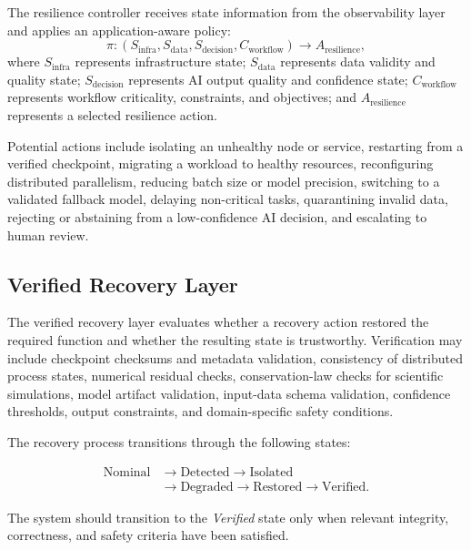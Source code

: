 \documentclass[conference]{IEEEtran}
\begin{document}
The resilience controller receives state information from the observability layer and applies an application-aware policy:
\begin{equation}
\pi : (S_{\mathrm{infra}}, S_{\mathrm{data}}, S_{\mathrm{decision}}, C_{\mathrm{workflow}}) \rightarrow A_{\mathrm{resilience}},
\end{equation}
where $S_{\mathrm{infra}}$ represents infrastructure state; $S_{\mathrm{data}}$ represents data validity and quality state; $S_{\mathrm{decision}}$ represents AI output quality and confidence state; $C_{\mathrm{workflow}}$ represents workflow criticality, constraints, and objectives; and $A_{\mathrm{resilience}}$ represents a selected resilience action.

Potential actions include isolating an unhealthy node or service, restarting from a verified checkpoint, migrating a workload to healthy resources, reconfiguring distributed parallelism, reducing batch size or model precision, switching to a validated fallback model, delaying non-critical tasks, quarantining invalid data, rejecting or abstaining from a low-confidence AI decision, and escalating to human review.

\subsection{Verified Recovery Layer}

The verified recovery layer evaluates whether a recovery action restored the required function and whether the resulting state is trustworthy. Verification may include checkpoint checksums and metadata validation, consistency of distributed process states, numerical residual checks, conservation-law checks for scientific simulations, model artifact validation, input-data schema validation, confidence thresholds, output constraints, and domain-specific safety conditions.

The recovery process transitions through the following states:

\begin{equation}
\begin{aligned}
\text{Nominal}
&\rightarrow \text{Detected}
\rightarrow \text{Isolated} \\
&\rightarrow \text{Degraded}
\rightarrow \text{Restored}
\rightarrow \text{Verified}.
\end{aligned}
\label{eq:recovery-states}
\end{equation}

The system should transition to the \emph{Verified} state only when relevant integrity, correctness, and safety criteria have been satisfied.
\end{document}

